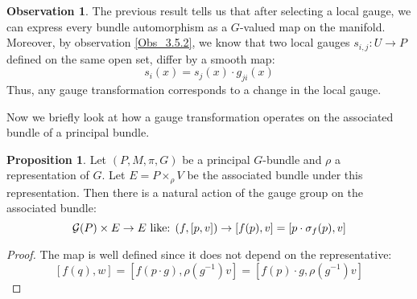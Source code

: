\documentclass[12pt,a4paper]{report}
\theoremstyle{definition}
\theoremstyle{Theorem}
\newtheorem{Prop}[Def]{Proposition}
\theoremstyle{definition}
\theoremstyle{definition}
\newtheorem{Obs}[Def]{Observation}
\begin{document}
	\begin{Obs}
		The previous result tells us that after selecting a local gauge, we can express every bundle automorphism as a $G$-valued map on the manifold. Moreover, by observation \ref{Obs_3.5.2}, we know that two local gauges $s_{i,j}:U\rightarrow P$ defined on the same open set, differ by a smooth map: $$s_i(x)=s_j(x)\cdot g_{ji}(x)$$
		Thus, any gauge transformation corresponds to a change in the local gauge.
	\end{Obs}
	Now we briefly look at how a gauge transformation operates on the associated bundle of a principal bundle.
	\begin{Prop}\label{Prop_7.1.3}
		Let $(P,M,\pi,G)$ be a principal $G$-bundle and $\rho$ a representation of $G$. Let $E=P\times_\rho V$ be the associated bundle under this representation. Then there is a natural action of the gauge group on the associated bundle:
		$$\mathcal{G}(P)\times E\rightarrow E\hbox{ like: }(f,[p,v])\rightarrow [f(p),v]=[p\cdot \sigma_f(p),v]$$
	\end{Prop}
	\begin{proof}
		The map is well defined since it does not depend on the representative:
		$$[f(q),w]=[f(p\cdot g),\rho(g^{-1})v]=[f(p)\cdot g,\rho(g^{-1})v]$$
	\end{proof}
\end{document}
